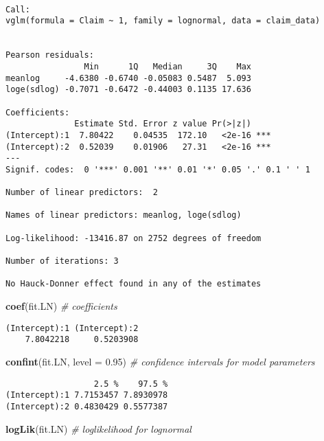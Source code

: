 \documentclass[]{book}
\newenvironment{Shaded}{\begin{snugshade}}{\end{snugshade}}
\newcommand{\KeywordTok}[1]{\textcolor[rgb]{0.13,0.29,0.53}{\textbf{#1}}}
\newcommand{\DataTypeTok}[1]{\textcolor[rgb]{0.13,0.29,0.53}{#1}}
\newcommand{\FloatTok}[1]{\textcolor[rgb]{0.00,0.00,0.81}{#1}}
\newcommand{\CommentTok}[1]{\textcolor[rgb]{0.56,0.35,0.01}{\textit{#1}}}
\newcommand{\NormalTok}[1]{#1}
\theoremstyle{definition}
\theoremstyle{definition}
\theoremstyle{definition}
\theoremstyle{remark}
\begin{document}
\begin{verbatim}

Call:
vglm(formula = Claim ~ 1, family = lognormal, data = claim_data)


Pearson residuals:
                Min      1Q   Median     3Q    Max
meanlog     -4.6380 -0.6740 -0.05083 0.5487  5.093
loge(sdlog) -0.7071 -0.6472 -0.44003 0.1135 17.636

Coefficients: 
              Estimate Std. Error z value Pr(>|z|)    
(Intercept):1  7.80422    0.04535  172.10   <2e-16 ***
(Intercept):2  0.52039    0.01906   27.31   <2e-16 ***
---
Signif. codes:  0 '***' 0.001 '**' 0.01 '*' 0.05 '.' 0.1 ' ' 1

Number of linear predictors:  2 

Names of linear predictors: meanlog, loge(sdlog)

Log-likelihood: -13416.87 on 2752 degrees of freedom

Number of iterations: 3 

No Hauck-Donner effect found in any of the estimates
\end{verbatim}

\begin{Shaded}
\begin{Highlighting}[]
\KeywordTok{coef}\NormalTok{(fit.LN)                   }\CommentTok{# coefficients}
\end{Highlighting}
\end{Shaded}

\begin{verbatim}
(Intercept):1 (Intercept):2 
    7.8042218     0.5203908 
\end{verbatim}

\begin{Shaded}
\begin{Highlighting}[]
\KeywordTok{confint}\NormalTok{(fit.LN, }\DataTypeTok{level =} \FloatTok{0.95}\NormalTok{)  }\CommentTok{# confidence intervals for model parameters }
\end{Highlighting}
\end{Shaded}

\begin{verbatim}
                  2.5 %    97.5 %
(Intercept):1 7.7153457 7.8930978
(Intercept):2 0.4830429 0.5577387
\end{verbatim}

\begin{Shaded}
\begin{Highlighting}[]
\KeywordTok{logLik}\NormalTok{(fit.LN)                 }\CommentTok{# loglikelihood for lognormal}
\end{Highlighting}
\end{Shaded}
\end{document}
